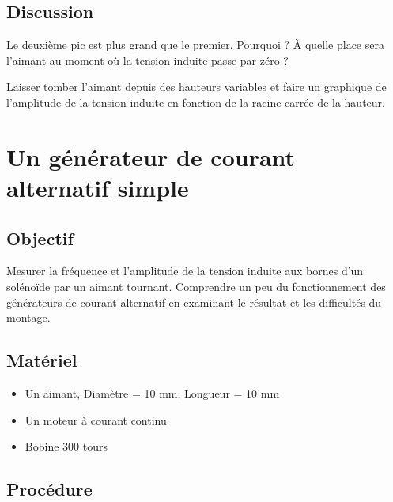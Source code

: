 \documentclass{book}
\begin{document}
\subsection{Discussion}


Le deuxième pic est plus grand que le premier. Pourquoi ? À quelle place sera l'aimant au moment où la tension induite passe par zéro ?



Laisser tomber l'aimant depuis des hauteurs variables et faire un graphique de l'amplitude de la tension induite en fonction de la racine carrée de la hauteur.







\section{Un générateur de courant alternatif simple}


 \label{sec:A-simple-AC}

\subsection{Objectif}


Mesurer la fréquence et l'amplitude de la tension induite aux bornes d'un solénoïde par un aimant tournant. Comprendre un peu du fonctionnement des générateurs de courant alternatif en examinant le résultat et les difficultés du montage.




\subsection{Matériel}


\begin{itemize}
  \item Un aimant, Diamètre = 10 mm, Longueur = 10 mm
  \item Un moteur à courant continu
  \item Bobine 300 tours
\end{itemize}

\subsection{Procédure}
\end{document}
